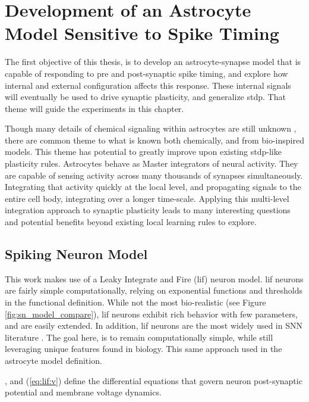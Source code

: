 %

\chapter{Development of an Astrocyte Model Sensitive to Spike Timing} \label{chapter:obj1}
The first objective of this thesis, is to develop an astrocyte-synapse model
that is capable of responding to pre and post-synaptic spike timing, and
explore how internal and external configuration affects this response. These
internal signals will eventually be used to drive synaptic plasticity, and
generalize \gls{stdp}. That theme will guide the experiments in this chapter.

Though many details of chemical signaling within astrocytes are still unknown
\parencite{manninen_2018}, there are common theme to what is known both chemically,
and from bio-inspired models. This theme has potential to greatly improve upon
existing \gls{stdp}-like plasticity rules. Astrocytes behave as Master integrators of
neural activity. They are capable of sensing activity across many thousands of
synapses simultaneously. Integrating that activity quickly at the local level,
and propagating signals to the entire cell body, integrating over a longer
time-scale. Applying this multi-level integration approach to synaptic
plasticity leads to many interesting questions and potential benefits beyond
existing local learning rules to explore.

\section{Spiking Neuron Model}
This work makes use of a Leaky Integrate and Fire (\gls{lif}) neuron model. \Gls{lif}
neurons are fairly simple computationally, relying on exponential functions
and thresholds in the functional definition. While not the most
bio-realistic (see Figure \ref{fig:sn_model_compare}), \gls{lif} neurons exhibit
rich behavior with few parameters, and are easily extended. In addition, \gls{lif}
neurons are the most widely used in SNN literature \parencite{ponulak_2011}. The
goal here, is to remain computationally simple, while still leveraging unique
features found in biology. This same approach used in the astrocyte model
definition.

, and (\ref{eq:lif:v}) define the differential equations
that govern neuron post-synaptic potential and membrane voltage dynamics.

